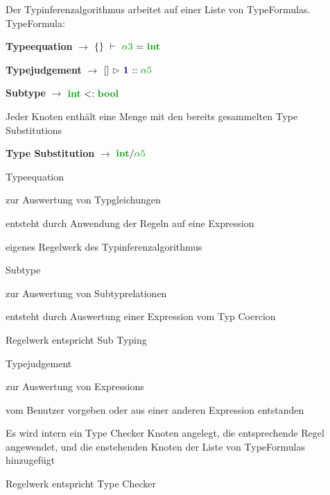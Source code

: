 { 
    \begin{itemgroup}{Der Typinferenzalgorithmus arbeitet auf einer Liste von TypeFormulas. \\[8mm] 
	TypeFormula:\\[-6mm]}
    
    \item \textbf{Typeequation} 	$\to$	$\SeenTypes{}\ \vdash\ \TypeEquationTypeInference
	{\TypeTypeVariable{\alpha3}} {\TypeIntegerType} $ 
    \item \textbf{Typejudgement} $\to$  	 $\TypeJudgement {\TypeEnvironment{}} {\ExprConstant{1}}
    	{\TypeTypeVariable{\alpha5}} $ 
    \item \textbf{Subtype}	$\to$	$\TypeSubType {\TypeIntegerType} {\TypeBooleanType} $  \\[-3mm]

    \end{itemgroup}

  \begin{itemgroup}{Jeder Knoten enthält eine Menge mit den bereits gesammelten Type Substitutions\\[-6mm]}
    \item \textbf{Type Substitution}	$\to$ $\TypeSubstitution{\TypeIntegerType}{\TypeTypeVariable{\alpha5}}$
  \end{itemgroup}
}

{ 
    \begin{itemgroup}{Typeequation}
     
	\item zur Auswertung von Typgleichungen
	\item entsteht durch Anwendung der Regeln auf eine Expression 
	\item eigenes Regelwerk des Typinferenzalgorithmus  \\
    \end{itemgroup}
    \begin{itemgroup}{Subtype}	
	\item zur Auswertung von Subtyprelationen
	\item entsteht durch Auswertung einer Expression vom Typ Coercion
	\item Regelwerk entspricht Sub Typing
     \end{itemgroup}
}

{ 
	\begin{itemgroup}{Typejudgement}
	\item zur Auswertung von Expressions 
	\item vom Benutzer vorgeben oder aus einer anderen Expression entstanden
	\item Es wird intern ein Type Checker Knoten angelegt, die entsprechende Regel angewendet,
	   und die enstehenden Knoten der Liste von TypeFormulas hinzugefügt
	\item Regelwerk entspricht Type Checker
     \end{itemgroup}
}
